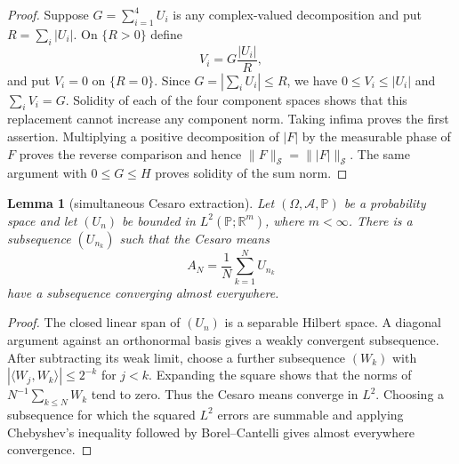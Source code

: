 \documentclass[11pt]{article}
\newtheorem{lemma}[theorem]{Lemma}
\newcommand{\Sspace}{\mathcal S}
\begin{document}
\begin{proof}
Suppose $G=\sum_{i=1}^4 U_i$ is any complex-valued decomposition and put
$R=\sum_i|U_i|$.  On $\{R>0\}$ define
\[
 V_i=G\frac{|U_i|}{R},
\]
and put $V_i=0$ on $\{R=0\}$.  Since $G=|\sum_iU_i|\leq R$, we have
$0\leq V_i\leq|U_i|$ and $\sum_iV_i=G$.  Solidity of each of the four
component spaces shows that this replacement cannot increase any component
norm.  Taking infima proves the first assertion.  Multiplying a positive
decomposition of $|F|$ by the measurable phase of $F$ proves the reverse
comparison and hence $\|F\|_{\Sspace}=\||F|\|_{\Sspace}$.  The same argument
with $0\leq G\leq H$ proves solidity of the sum norm.
\end{proof}

\begin{lemma}[simultaneous Cesaro extraction]\label{lem:cesaro}
Let $(\Omega,\mathcal A,\mathbb P)$ be a probability space and let
$(U_n)$ be bounded in $L^2(\mathbb P;\mathbb R^m)$, where $m<\infty$.  There
is a subsequence $(U_{n_k})$ such that the Cesaro means
\[
 A_N=\frac1N\sum_{k=1}^N U_{n_k}
\]
have a subsequence converging almost everywhere.
\end{lemma}

\begin{proof}
The closed linear span of $(U_n)$ is a separable Hilbert space.  A diagonal
argument against an orthonormal basis gives a weakly convergent subsequence.
After subtracting its weak limit, choose a further subsequence $(W_k)$ with
$|\langle W_j,W_k\rangle|\leq2^{-k}$ for $j<k$.  Expanding the square shows
that the norms of $N^{-1}\sum_{k\leq N}W_k$ tend to zero.  Thus the Cesaro
means converge in $L^2$.  Choosing a subsequence for which the squared
$L^2$ errors are summable and applying Chebyshev's inequality followed by
Borel--Cantelli gives almost everywhere convergence.
\end{proof}
\end{document}
